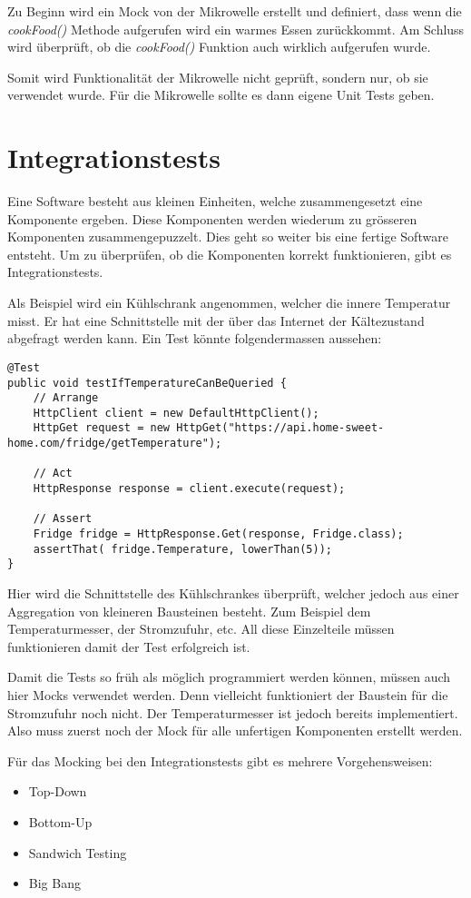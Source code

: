 Zu Beginn wird ein Mock von der Mikrowelle erstellt und definiert, dass wenn die \textit{cookFood()} Methode aufgerufen wird ein warmes Essen zurückkommt. Am Schluss wird überprüft, ob die \textit{cookFood()} Funktion auch wirklich aufgerufen wurde.

Somit wird Funktionalität der Mikrowelle nicht geprüft, sondern nur, ob sie verwendet wurde. Für die Mikrowelle sollte es dann eigene Unit Tests geben.

\section{Integrationstests}
Eine Software besteht aus kleinen Einheiten, welche zusammengesetzt eine Komponente ergeben. Diese Komponenten werden wiederum zu grösseren Komponenten zusammengepuzzelt. Dies geht so weiter bis eine fertige Software entsteht. Um zu überprüfen, ob die Komponenten korrekt funktionieren, gibt es Integrationstests.

Als Beispiel wird ein Kühlschrank angenommen, welcher die innere Temperatur misst. Er hat eine Schnittstelle mit der über das Internet der Kältezustand abgefragt werden kann. Ein Test könnte folgendermassen aussehen:


\begin{lstlisting}
@Test
public void testIfTemperatureCanBeQueried {
	// Arrange
	HttpClient client = new DefaultHttpClient();
    HttpGet request = new HttpGet("https://api.home-sweet-home.com/fridge/getTemperature");
 
    // Act
    HttpResponse response = client.execute(request);
 
    // Assert
    Fridge fridge = HttpResponse.Get(response, Fridge.class);
    assertThat( fridge.Temperature, lowerThan(5));
}
\end{lstlisting}

Hier wird die Schnittstelle des Kühlschrankes überprüft, welcher jedoch aus einer Aggregation von kleineren Bausteinen besteht. Zum Beispiel dem Temperaturmesser, der Stromzufuhr, etc. All diese Einzelteile müssen funktionieren damit der Test erfolgreich ist. 

Damit die Tests so früh als möglich programmiert werden können, müssen auch hier Mocks verwendet werden. Denn vielleicht funktioniert der Baustein für die Stromzufuhr noch nicht. Der Temperaturmesser ist jedoch bereits implementiert. Also muss zuerst noch der Mock für alle unfertigen Komponenten erstellt werden. 

Für das Mocking bei den Integrationstests gibt es mehrere Vorgehensweisen:
\begin{itemize}
\item Top-Down
\item Bottom-Up
\item Sandwich Testing
\item Big Bang
\end{itemize}

